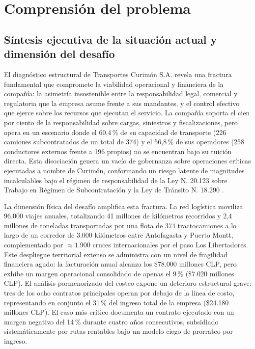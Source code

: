 \section{Comprensión del problema}

\subsection{Síntesis ejecutiva de la situación actual y dimensión del desafío}

El diagnóstico estructural de Transportes Curimón S.A. revela una fractura fundamental que compromete la viabilidad operacional y financiera de la compañía: la asimetría insostenible entre la responsabilidad legal, comercial y regulatoria que la empresa asume frente a sus mandantes, y el control efectivo que ejerce sobre los recursos que ejecutan el servicio. La compañía soporta el cien por ciento de la responsabilidad sobre cargas, siniestros y fiscalizaciones, pero opera en un escenario donde el 60,4\,\% de su capacidad de transporte (226 camiones subcontratados de un total de 374) y el 56,8\,\% de sus operadores (258 conductores externos frente a 196 propios) no se encuentran bajo su tuición directa. Esta disociación genera un vacío de gobernanza sobre operaciones críticas ejecutadas a nombre de Curimón, conformando un riesgo latente de magnitudes incalculables bajo el régimen de responsabilidad de la Ley N.\textordmasculine{} 20.123 sobre Trabajo en Régimen de Subcontratación \parencite{ley20123} y la Ley de Tránsito N.\textordmasculine{} 18.290 \parencite{ley18290}.

La dimensión física del desafío amplifica esta fractura. La red logística moviliza 96.000 viajes anuales, totalizando 41 millones de kilómetros recorridos y 2,4 millones de toneladas transportadas por una flota de 374 tractocamiones a lo largo de un corredor de 3.000 kilómetros entre Antofagasta y Puerto Montt, complementado por $\approx 1.900$ cruces internacionales por el paso Los Libertadores. Este despliegue territorial extenso se administra con un nivel de fragilidad financiera agudo: la facturación anual alcanza los \$78.000 millones CLP, pero exhibe un margen operacional consolidado de apenas el 9\,\% (\$7.020 millones CLP). El análisis pormenorizado del costeo expone un deterioro estructural grave: tres de los ocho contratos principales operan por debajo de la línea de costo, representando en conjunto el 31\,\% del ingreso total de la empresa (\$24.180 millones CLP). El caso más crítico documenta un contrato ejecutado con un margen negativo del 14\,\% durante cuatro años consecutivos, subsidiado sistemáticamente por rutas rentables bajo un modelo ciego de prorrateo por ingreso.

